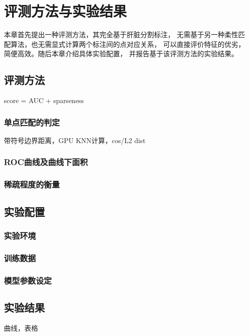 
\chapter{评测方法与实验结果}
本章首先提出一种评测方法，其完全基于肝脏分割标注，
无需基于另一种柔性匹配算法，也无需显式计算两个标注间的点对应关系，
可以直接评价特征的优劣，简便高效。随后本章介绍具体实验配置，
并报告基于该评测方法的实验结果。

\section{评测方法}

score = AUC + sparseness

\subsection{单点匹配的判定}
带符号边界距离，GPU KNN计算，cos/L2 dist

\subsection{ROC曲线及曲线下面积}

\subsection{稀疏程度的衡量}


\section{实验配置}

\subsection{实验环境}

\subsection{训练数据}

\subsection{模型参数设定}


\section{实验结果}
曲线，表格




